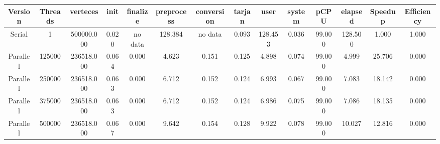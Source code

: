 \begin{tabular}{|c|c|c|c|c|c|c|c|c|c|c|c|c|c|}
\toprule
 Version &  Threads &   verteces &  init & finalize &  preprocess & conversion &  tarjan &    user &  system &   pCPU &  elapsed &  Speedup &  Efficiency \\
\midrule
  Serial &        1 & 500000.000 & 0.020 &  no data &     128.384 &    no data &   0.093 & 128.453 &   0.036 & 99.000 &  128.500 &    1.000 &       1.000 \\
Parallel &   125000 & 236518.000 & 0.064 &    0.000 &       4.623 &      0.151 &   0.125 &   4.898 &   0.074 & 99.000 &    4.999 &   25.706 &       0.000 \\
Parallel &   250000 & 236518.000 & 0.063 &    0.000 &       6.712 &      0.152 &   0.124 &   6.993 &   0.067 & 99.000 &    7.083 &   18.142 &       0.000 \\
Parallel &   375000 & 236518.000 & 0.063 &    0.000 &       6.712 &      0.152 &   0.124 &   6.986 &   0.075 & 99.000 &    7.086 &   18.135 &       0.000 \\
Parallel &   500000 & 236518.000 & 0.067 &    0.000 &       9.642 &      0.154 &   0.128 &   9.922 &   0.078 & 99.000 &   10.027 &   12.816 &       0.000 \\
\bottomrule
\end{tabular}
